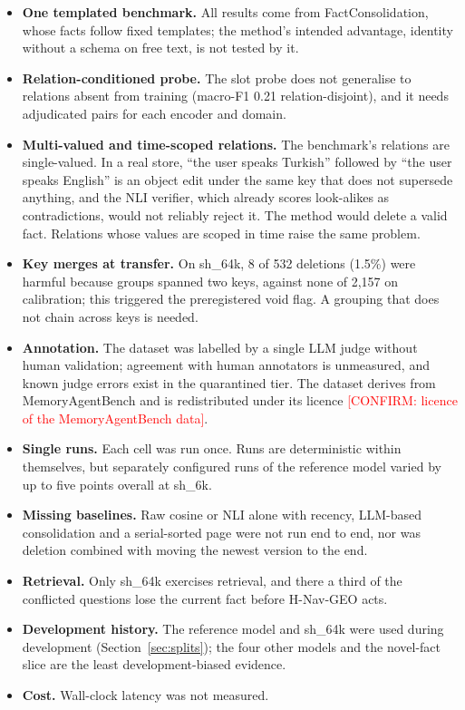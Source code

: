 \documentclass[journal=jcisd8,manuscript=article]{achemso}
\newcommand{\sub}[1]{\textsf{sh\_#1}}                    %
\newcommand{\confirm}[1]{\textcolor{red}{[CONFIRM: #1]}} %
\newcommand{\geo}{H-Nav-GEO}
\begin{document}
\begin{itemize}
\item \textbf{One templated benchmark.} All results come from FactConsolidation, whose facts follow fixed templates; the method's intended advantage, identity without a schema on free text, is not tested by it.
\item \textbf{Relation-conditioned probe.} The slot probe does not generalise to relations absent from training (macro-F1 0.21 relation-disjoint), and it needs adjudicated pairs for each encoder and domain.
\item \textbf{Multi-valued and time-scoped relations.} The benchmark's relations are single-valued. In a real store, ``the user speaks Turkish'' followed by ``the user speaks English'' is an object edit under the same key that does not supersede anything, and the NLI verifier, which already scores look-alikes as contradictions, would not reliably reject it. The method would delete a valid fact. Relations whose values are scoped in time raise the same problem.
\item \textbf{Key merges at transfer.} On \sub{64k}, 8 of 532 deletions (1.5\%) were harmful because groups spanned two keys, against none of 2,157 on calibration; this triggered the preregistered void flag. A grouping that does not chain across keys is needed.
\item \textbf{Annotation.} The dataset was labelled by a single LLM judge without human validation; agreement with human annotators is unmeasured, and known judge errors exist in the quarantined tier. The dataset derives from MemoryAgentBench and is redistributed under its licence \confirm{licence of the MemoryAgentBench data}.
\item \textbf{Single runs.} Each cell was run once. Runs are deterministic within themselves, but separately configured runs of the reference model varied by up to five points overall at \sub{6k}.
\item \textbf{Missing baselines.} Raw cosine or NLI alone with recency, LLM-based consolidation and a serial-sorted page were not run end to end, nor was deletion combined with moving the newest version to the end.
\item \textbf{Retrieval.} Only \sub{64k} exercises retrieval, and there a third of the conflicted questions lose the current fact before \geo{} acts.
\item \textbf{Development history.} The reference model and \sub{64k} were used during development (Section~\ref{sec:splits}); the four other models and the novel-fact slice are the least development-biased evidence.
\item \textbf{Cost.} Wall-clock latency was not measured.
\end{itemize}
\end{document}
